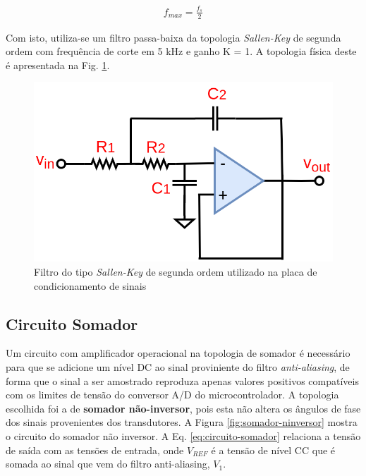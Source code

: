 	\begin{align}
		f_{max} = \frac{f_s}{2}\label{eq:freq_sinal}
	\end{align}

	Com isto, utiliza-se um filtro passa-baixa da topologia \textit{Sallen-Key} de segunda ordem com frequência de corte em 5 kHz e ganho K = 1. A topologia física deste é apresentada na Fig. \ref{fig:filtro-sallen}.
	
	\begin{figure}[!hbt]
			\begin{center}
			\includegraphics[scale=0.25]{figuras/sallen_key.png}
			\caption{Filtro do tipo \textit{Sallen-Key} de segunda ordem utilizado na placa de condicionamento de sinais}
			\label{fig:filtro-sallen}
			\end{center}
	\end{figure}

%	

\subsection{Circuito Somador}

Um circuito com amplificador operacional na topologia de somador é necessário para que se adicione um nível DC ao sinal proviniente do filtro \textit{anti-aliasing}, de forma que o sinal a ser amostrado reproduza apenas valores positivos compatíveis com os limites de tensão do conversor A/D do microcontrolador. 
A topologia escolhida foi a de \textbf{somador não-inversor}, pois esta não altera os ângulos de fase dos sinais provenientes dos transdutores. A Figura \ref{fig:somador-ninversor} mostra o circuito do somador não inversor. A Eq. \ref{eq:circuito-somador} relaciona a tensão de saída com as tensões de entrada, onde $V_{REF}$ é a tensão de nível CC que é somada ao sinal que vem do filtro anti-aliasing, $V_1$.

